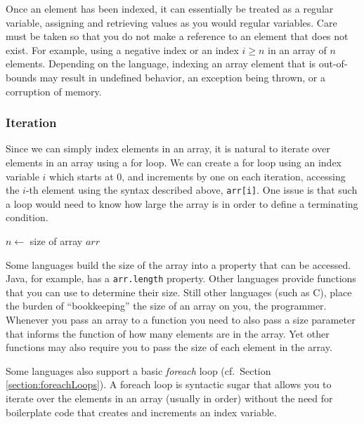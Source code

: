 Once an element has been indexed, it can essentially be treated as
a regular variable, assigning and retrieving values as you would regular
variables.  Care must be taken so that you do not make a reference
to an element that does not exist.  For example, using a negative
index or an index $i \geq n$ in an array of $n$ elements.  Depending
on the language, indexing an array element that is out-of-bounds may
result in undefined behavior, an exception being thrown, or a
corruption of memory.

\subsubsection{Iteration}

Since we can simply index elements in an array, it is natural to
iterate over elements in an array using a for loop.  We can create
a for loop using an index variable $i$ which starts at 0, and increments
by one on each iteration, accessing the $i$-th element using the
syntax described above, \texttt{arr[i]}.  One issue is that
such a loop would need to know how large the array is in order
to define a terminating condition.  

\begin{algorithm}
$n \leftarrow$ size of array $arr$ \;
\end{algorithm}

Some languages build the size of the array into a property that 
can be accessed.  Java, for example, has a \texttt{arr.length} 
property.  Other languages provide functions that you can use to
determine their size.  Still other languages (such as C), 
place the burden of ``bookkeeping'' the size of an array on you, the
programmer.  Whenever you pass an array to a function you need
to also pass a size parameter that informs the function of how many
elements are in the array.  Yet other functions may also require you
to pass the size of each element in the array.


Some languages also support a basic \emph{foreach} loop (cf.\ 
Section \ref{section:foreachLoops}).  A foreach loop is 
\gls{syntactic sugar} that allows you to iterate over the elements 
in an array (usually in order) without the need for boilerplate code 
that creates and increments an index variable.

\begin{algorithm}
\end{algorithm}

